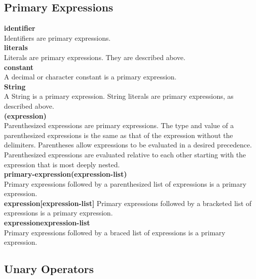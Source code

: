 \documentclass[12pt]{report}
\begin{document}
    \subsection*{Primary Expressions}
    \textbf{identifier}\\
      Identifiers are primary expressions.\\ 
    \textbf{literals}\\
      Literals are primary expressions. They are described above. \\
    \textbf{constant}\\
      A decimal or character constant is a primary expression. \\
    \textbf{String}\\
      A String is a primary expression. String literals are primary expressions, as described above. \\
    \textbf{(expression)}\\
      Parenthesized expressions are primary expressions. The type and value of a parenthesized expressions is the same as that of the expression without the delimiters. Parentheses allow expressions to be evaluated in a desired precedence. Parenthesized expressions are evaluated relative to each other starting with the expression that is most deeply nested. \\
    \textbf{primary-expression(expression-list)}\\
      Primary expressions followed by a parenthesized list of expressions is a primary expression. \\
    \textbf{expression[expression-list]}
      Primary expressions followed by a bracketed list of expressions is a primary expression.\\
    \textbf{expression{expression-list}}\\
      Primary expressions followed by a braced list of expressions is a primary expression.

    
    \subsection*{Unary Operators}
    
\end{document}
